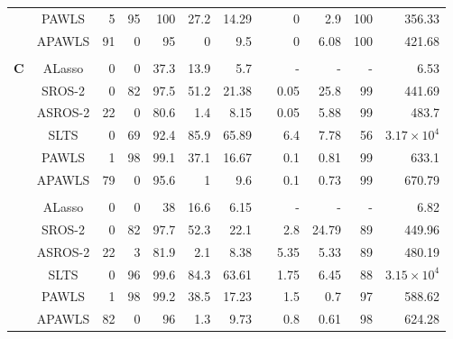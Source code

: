 \documentclass{article}\usepackage[]{graphicx}\usepackage[]{color}
\begin{document}
\begin{table}[thp]
\begin{center}
\begin{tabular}{ccrrrrrrrrrr}
	      & PAWLS & 5 & 95 & 100 
	      & 27.2 & 14.29 & & 0 
	      & 2.9 & 100 & 356.33\\
	      
	      & APAWLS & 91 & 0 & 95 
	      & 0 & 9.5 & & 0 
	      & 6.08 & 100 & 421.68\\
	      \\
	        	  \multirow{8}{*}{{\bf C}}
	       & ALasso & 0 & 0 & 37.3 
	      & 13.9 & 5.7 & & -& - & - &  6.53\\
	      
	       & SROS-2 & 0 & 82 & 97.5 
	      & 51.2 & 21.38 & & 0.05 
	      & 25.8 & 99 & 441.69\\
	      
	      & ASROS-2 & 22 & 0 & 80.6 
	      & 1.4 & 8.15 & & 0.05 
	      & 5.88 & 99 & 483.7\\
	      
	      
	       & SLTS & 0 & 69 & 92.4 
	      & 85.9 & 65.89 & & 6.4 
	      & 7.78 & 56 & \ensuremath{3.17\times 10^{4}}\\
	      
	      & PAWLS & 1 & 98 & 99.1 
	      & 37.1 & 16.67 & & 0.1 
	      & 0.81 & 99 & 633.1\\
	      
	      & APAWLS & 79 & 0 & 95.6 
	      & 1 & 9.6 & & 0.1 
	      & 0.73 & 99 & 670.79\\
	      
	     \\
	       	  \multirow{8}{*}{{\bf D}}
	      & ALasso & 0 & 0 & 38 
	      & 16.6 & 6.15 & & -& - & - &  6.82\\
	      
	       & SROS-2 & 0 & 82 & 97.7 
	      & 52.3 & 22.1 & & 2.8 
	      & 24.79 & 89 & 449.96\\
	      
	      & ASROS-2 & 22 & 3 & 81.9 
	      & 2.1 & 8.38 & & 5.35 
	      & 5.33 & 89 & 480.19\\
	      
	      
	       & SLTS & 0 & 96 & 99.6 
	      & 84.3 & 63.61 & & 1.75 
	      & 6.45 & 88 & \ensuremath{3.15\times 10^{4}}\\
	      
	      & PAWLS & 1 & 98 & 99.2 
	      & 38.5 & 17.23 & & 1.5 
	      & 0.7 & 97 & 588.62\\
	      
	      & APAWLS & 82 & 0 & 96 
	      & 1.3 & 9.73 & & 0.8 
	      & 0.61 & 98 & 624.28\\
	      

\end{tabular}
\end{center}
\end{table}
\end{document}
